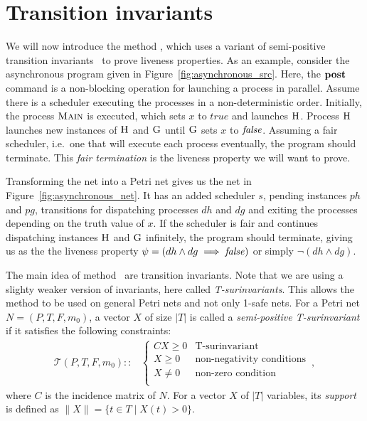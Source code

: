 \section{Transition invariants}
\label{sec:transition_invariants}

We will now introduce the method \liveness, which uses
a variant of semi-positive transition invariants~\cite{EsparzaBruns96}
to prove liveness properties. As an example, consider the
asynchronous program given in Figure~\ref{fig:asynchronous_src}.
Here, the $\textbf{post}$ command is a non-blocking operation for
launching a process in parallel. Assume there is a scheduler
executing the processes in a non-deterministic order.
Initially, the process $\textsc{Main}$ is executed, which
sets $x$ to $true$ and launches $\textsc{H}$.
Process $\textsc{H}$ launches new instances of $\textsc{H}$
and $\textsc{G}$ until $\textsc{G}$ sets $x$ to $\operatorname{\mathit{false}}$.
Assuming a fair scheduler, i.e.\ one that will execute each process
eventually, the program should terminate. This
\emph{fair termination} is the liveness
property we will want to prove.



Transforming the net into a Petri net gives us the net in
Figure~\ref{fig:asynchronous_net}. It has an added scheduler
$s$, pending instances $ph$ and $pg$, transitions for
dispatching processes $dh$ and $dg$ and exiting the processes
depending on the truth value of $x$.
If the scheduler is fair and continues dispatching instances
$\textsc{H}$ and $\textsc{G}$ 
infinitely, the program should terminate, giving us as the
the liveness property $\psi = (dh \land dg \implies \operatorname{\mathit{false}})$
or simply $\neg (dh \land dg)$.



The main idea of method \liveness\ are transition invariants.
Note that we are using a slighty weaker version of invariants,
here called \emph{T-surinvariants}. This allows the method to be
used on general Petri nets and not only 1-safe nets.
For a Petri net $N = (P, T, F, m_0)$,
a vector $X$ of size $|T|$ is
called a \emph{semi-positive T-surinvariant} if it satisfies the following
constraints:
\begin{align*}
  \mathcal{T}(P, T, F, m_0) ::&
  \begin{cases}
    C X \ge 0 & \text{T-surinvariant} \\
      X \ge 0 & \text{non-negativity conditions} \\
      X \ne 0 & \text{non-zero condition} \\
  \end{cases}\,,
\end{align*}
where $C$ is the incidence matrix of $N$.
For a vector $X$ of $|T|$ variables, its \emph{support} is defined
as $\|X\| = \{ t ∈ T \mid X(t) > 0 \}$.

